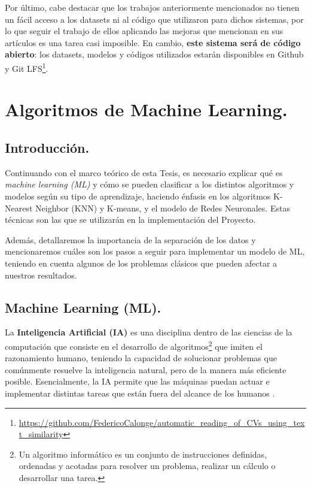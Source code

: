 \documentclass[12pt,a4paper]{article}
\begin{document}
\begin{sloppypar}
Por último, cabe destacar que los trabajos anteriormente mencionados no tienen un fácil acceso a los datasets ni al código que utilizaron para dichos sistemas, por lo que seguir el trabajo de ellos aplicando las mejoras que mencionan en sus artículos es una tarea casi imposible. En cambio, \textbf{este sistema será de código abierto}: los datasets, modelos y códigos utilizados estarán disponibles en Github y Git LFS\footnote{\url{https://github.com/FedericoCalonge/automatic_reading_of_CVs_using_text_similarity}}.

\cleardoublepage    %

\section{Algoritmos de Machine Learning.}\label{3.AlgoritmosdeMachineLearning}

\subsection{Introducción.}
Continuando con el marco teórico de esta Tesis, es necesario explicar qué es \textit{machine learning (ML)} y cómo se pueden clasificar a los distintos algoritmos y modelos según su tipo de aprendizaje, haciendo énfasis en los algoritmos K-Nearest Neighbor (KNN) y K-means, y el modelo de Redes Neuronales. Estas técnicas son las que se utilizarán en la implementación del Proyecto.

Además, detallaremos la importancia de la separación de los datos y mencionaremos cuáles son los pasos a seguir para implementar un modelo de ML, teniendo en cuenta algunos de los problemas clásicos que pueden afectar a nuestros resultados.

\subsection{Machine Learning (ML).} 

La \textbf{Inteligencia Artificial (IA)} es una disciplina dentro de las ciencias de la computación que consiste en el desarrollo de algoritmos\footnote{Un algoritmo informático es un conjunto de instrucciones definidas, ordenadas y acotadas para resolver un problema, realizar un cálculo o desarrollar una tarea.} que imiten el razonamiento humano, teniendo la capacidad de solucionar problemas que comúnmente resuelve la inteligencia natural, pero de la manera más eficiente posible. 
Esencialmente, la IA permite que las máquinas puedan actuar e implementar distintas tareas que están fuera del alcance de los humanos \cite{intro_algos_ML}.


\end{sloppypar}
\end{document}

